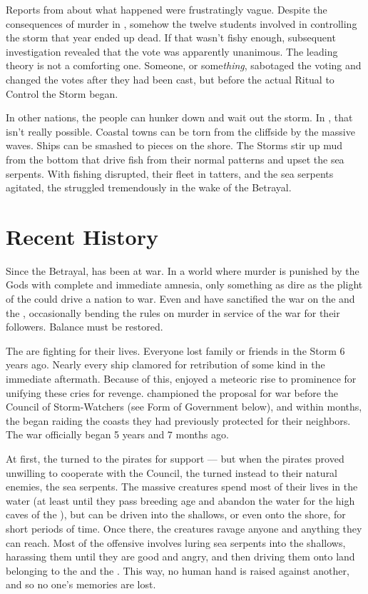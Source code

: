 \documentclass[blue]{GL2020}
\begin{document}
Reports from \pSchool{} about what happened were frustratingly vague. Despite the consequences of murder in \pEarth{}, somehow the twelve students involved in controlling the storm that year ended up dead. If that wasn't fishy enough, subsequent investigation revealed that the vote was apparently unanimous. The leading theory is not a comforting one. Someone, or some\emph{thing}, sabotaged the voting and changed the votes after they had been cast, but before the actual Ritual to Control the Storm began.

In other nations, the people can hunker down and wait out the storm. In \pShip{}, that isn't really possible. Coastal towns can be torn from the cliffside by the massive waves. Ships can be smashed to pieces on the shore. The Storms stir up mud from the bottom that drive fish from their normal patterns and upset the sea serpents. With fishing disrupted, their fleet in tatters, and the sea serpents agitated, the \pShip{} struggled tremendously in the wake of the Betrayal.

\section*{Recent History}
Since the Betrayal, \pEarth{} has been at war. In a world where murder is punished by the Gods with complete and immediate amnesia, only something as dire as the plight of the \pShippies{} could drive a nation to war. Even \cEbbFull{} and \cFlowFull{} have sanctified the war on the \pFarm{} and the \pTech{}, occasionally bending the rules on murder in service of the war for their followers. Balance must be restored.

The \pShip{} are fighting for their lives. Everyone lost family or friends in the Storm 6 years ago. Nearly every ship clamored for retribution of some kind in the immediate aftermath. Because of this, \cLoud{\full} enjoyed a meteoric rise to prominence for unifying these cries for revenge. \cLoud{\They} championed the proposal for war before the Council of Storm-Watchers (see Form of Government below), and within months, the \pShip{} began raiding the coasts they had previously protected for their neighbors. The war officially began 5 years and 7 months ago.

At first, the \pShippies{} turned to the pirates for support — but when the pirates proved unwilling to cooperate with the Council, the \pShippies{} turned instead to their natural enemies, the sea serpents. The massive creatures spend most of their lives in the water (at least until they pass breeding age and abandon the water for the high caves of the \pSpine{}), but can be driven into the shallows, or even onto the shore, for short periods of time. Once there, the creatures ravage anyone and anything they can reach. Most of the \pShip{} offensive involves luring sea serpents into the shallows, harassing them until they are good and angry, and then driving them onto land belonging to the \pFarm{} and the \pTech{}. This way, no human hand is raised against another, and so no one's memories are lost.
\end{document}
